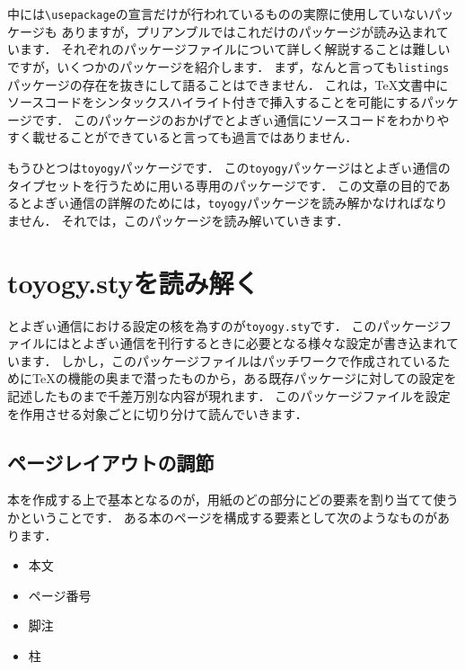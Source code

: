 中には\verb|\usepackage|の宣言だけが行われているものの実際に使用していないパッケージも
ありますが，プリアンブルではこれだけのパッケージが読み込まれています．
それぞれのパッケージファイルについて詳しく解説することは難しいですが，いくつかのパッケージを紹介します．
まず，なんと言っても\verb|listings|パッケージの存在を抜きにして語ることはできません．
これは，{\TeX}文書中にソースコードをシンタックスハイライト付きで挿入することを可能にするパッケージです．
このパッケージのおかげでとよぎぃ通信にソースコードをわかりやすく載せることができていると言っても過言ではありません．

もうひとつは\verb|toyogy|パッケージです．
この\verb|toyogy|パッケージはとよぎぃ通信のタイプセットを行うために用いる専用のパッケージです．
この文章の目的であるとよぎぃ通信の詳解のためには，\verb|toyogy|パッケージを読み解かなければなりません．
それでは，このパッケージを読み解いていきます．

\section{toyogy.styを読み解く}

とよぎぃ通信における設定の核を為すのが\texttt{toyogy.sty}です．
このパッケージファイルにはとよぎぃ通信を刊行するときに必要となる様々な設定が書き込まれています．
しかし，このパッケージファイルはパッチワークで作成されているために{\TeX}の機能の奥まで潜ったものから，ある既存パッケージに対しての設定を記述したものまで千差万別な内容が現れます．
このパッケージファイルを設定を作用させる対象ごとに切り分けて読んでいきます．

\subsection{ページレイアウトの調節}

本を作成する上で基本となるのが，用紙のどの部分にどの要素を割り当てて使うかということです．
ある本のページを構成する要素として次のようなものがあります．

\begin{itemize}
	\item 本文
	\item ページ番号
	\item 脚注
	\item 柱
\end{itemize}

